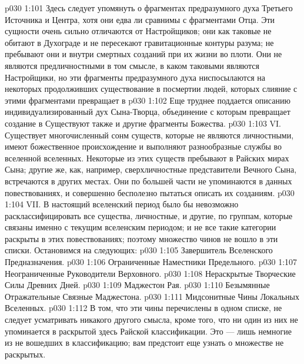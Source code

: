 \vs p030 1:101 Здесь следует упомянуть о фрагментах предразумного духа Третьего Источника и Центра, хотя они едва ли сравнимы с фрагментами Отца. Эти сущности очень сильно отличаются от Настройщиков; они как таковые не обитают в Духограде и не пересекают гравитационные контуры разума; не пребывают они и внутри смертных созданий при их жизни во плоти. Они не являются предличностными в том смысле, в каком таковыми являются Настройщики, но эти фрагменты предразумного духа ниспосылаются на некоторых продолживших существование в посмертии людей, которых слияние с этими фрагментами превращает в 
\vs p030 1:102 Еще труднее поддается описанию индивидуализированный дух Сына\hyp{}Творца, объединение с которым превращает создание в  Существуют также и другие фрагменты Божества.
\vs p030 1:103 \pc VI.  Существует многочисленный сонм существ, которые не являются личностными, имеют божественное происхождение и выполняют разнообразные службы во вселенной вселенных. Некоторые из этих существ пребывают в Райских мирах Сына; другие же, как, например, сверхличностные представители Вечного Сына, встречаются в других местах. Они по большей части не упоминаются в данных повествованиях, и совершенно бесполезно пытаться описать их  созданиям.
\vs p030 1:104 \pc VII.   В настоящий вселенский период было бы невозможно расклассифицировать все существа, личностные, и другие, по группам, которые связаны именно с текущим вселенским периодом; и не все такие категории раскрыты в этих повествованиях; поэтому множество чинов не вошло в эти списки. Остановимся на следующих:
\vs p030 1:105 Завершитель Вселенского Предназначения.
\vs p030 1:106 Ограниченные Наместники Предельного.
\vs p030 1:107 Неограниченные Руководители Верховного.
\vs p030 1:108 Нераскрытые Творческие Силы Древних Дней.
\vs p030 1:109 Маджестон Рая.
\vs p030 1:110 Безымянные Отражательные Связные Маджестона.
\vs p030 1:111 Мидсонитные Чины Локальных Вселенных.
\vs p030 1:112 \pc В том, что эти чины перечислены в одном списке, не следует усматривать никакого другого смысла, кроме того, что ни один из них не упоминается в раскрытой здесь Райской классификации. Это --- лишь немногие из не вошедших в классификацию; вам предстоит еще узнать о множестве не раскрытых.
